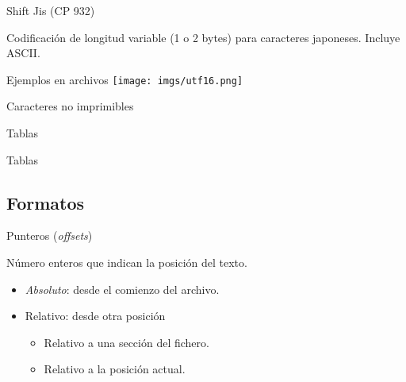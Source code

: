 \begin{frame}{Shift Jis (CP 932)}
    \begin{block}{}
        Codificación de longitud variable (1 o 2 bytes) para caracteres japoneses. Incluye ASCII.
    \end{block}
\end{frame}

\begin{frame}{Ejemplos en archivos}
    \centering\Large
    \texttt{[image: imgs/utf16.png]} \\
\end{frame}

\begin{frame}{Caracteres no imprimibles}
\end{frame}

\begin{frame}{Tablas}
\end{frame}

\begin{frame}{Tablas}
\end{frame}

\subsection{Formatos}
\begin{frame}{Punteros (\textit{offsets})}
    \begin{block}{}
        \centering{}Número enteros que indican la posición del texto.
    \end{block}
    \vfill{}
    \begin{itemize}
        \item<3-> \textit{Absoluto}: desde el comienzo del archivo.
        \item<4-> Relativo: desde otra posición
        \begin{itemize}
            \item Relativo a una sección del fichero.
            \item Relativo a la posición actual.
        \end{itemize}
    \end{itemize}
\end{frame}

